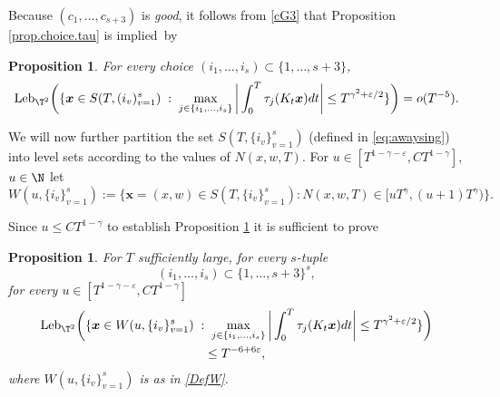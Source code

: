\documentclass[JEP,XML,SOM,Unicode,NoFloatCountersInSection]{cedram}
\newcommand\bx{\boldsymbol{x}}
\newcommand\Leb{\mathrm{Leb}}
\let\eps\varepsilon
\theoremstyle{definition}
\theoremstyle{plain}
\newtheorem{proposition}[definition]{Proposition}
\begin{document}
Because $(c_1,\ldots,c_{s+3})$ is {\it good}, it follows from \eqref{cG3} that Proposition \ref{prop.choice.tau} is implied~by\enlargethispage{-\baselineskip}%

\begin{proposition} \label{prop.tau.S} For every choice
$(i_1,\ldots,i_s)\subset \{1,\ldots,s+3\}$,
\begin{equation*}%
\Leb_{\T^2}\bigg(\{\bx\in S(T,(i_v)_{v=1}^s)\;:\; \max_{j \in \{i_1,\ldots,i_s\}} \bigg|\int_{0}^T \tau_j(K_t\bx)dt\bigg|\leq T^{\gamma^2+\eps/2}\}\bigg)={o(T^{-5})}.
\end{equation*}
\end{proposition}

We will now further partition the set $S(T,\{i_v\}_{v=1}^s)$ (defined in \eqref{eq:awaysing}) into level sets according to the values
of $N(x,w,T)$. For $u\in [T^{1-\gamma-\eps},CT^{1-\gamma}]$, $u \in \N$ let
\begin{equation}
\label{DefW}
W(u,\{i_v\}_{v=1}^s):=\{\bx\!=\!(x,w)\!\in\! S(T,\{i_v\}_{v=1}^s): N(x,w,T)\!\in\! [uT^\gamma,(u+1)T^\gamma)\}.
\end{equation}

Since $u\leq CT^{1-\gamma}$ to establish Proposition \ref{prop.tau.S} it is sufficient to prove

\begin{proposition} \label{prop.tau.U} For $T$ sufficiently large, for every $s$-tuple
\[
(i_1,\ldots,i_s)\subset \{1,\ldots,s+3\}^s,
\]
for every $u\in [T^{1-\gamma-\eps},CT^{1-\gamma}]$
\begin{multline}\label{eq:sti}
\Leb_{\T^2}\bigg(\{\bx\in W(u,\{i_v\}_{v=1}^s)\;:\; \max_{j \in \{i_1,\ldots,i_s\}} \bigg|\int_{0}^T \tau_j(K_t\bx)dt\bigg|\leq T^{\gamma^2+\eps/2}\}\bigg)\\
\leq T^{-6+6\eps},
\end{multline}
where $W(u,\{i_v\}_{v=1}^s)$ is as in \eqref{DefW}.
\end{proposition}
\end{document}

